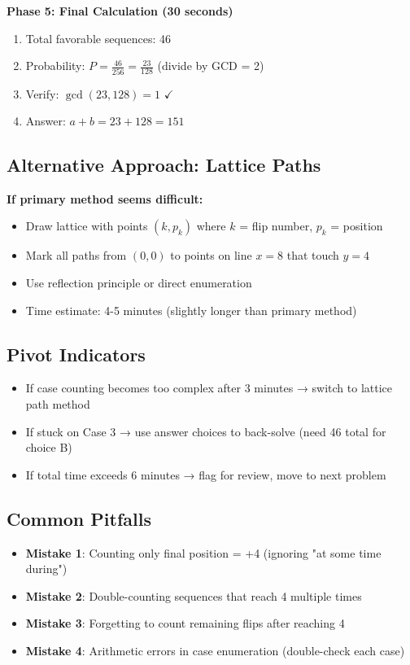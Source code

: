 \documentclass[]{article}
\begin{document}
\begin{solutionbox}
\textbf{Phase 5: Final Calculation (30 seconds)}
\begin{enumerate}
    \item Total favorable sequences: 46
    \item Probability: $P = \frac{46}{256} = \frac{23}{128}$ (divide by GCD = 2)
    \item Verify: $\gcd(23, 128) = 1$ $\checkmark$
    \item Answer: $a + b = 23 + 128 = 151$
\end{enumerate}

\subsection*{Alternative Approach: Lattice Paths}
\textbf{If primary method seems difficult:}
\begin{itemize}
    \item Draw lattice with points $(k, p_k)$ where $k$ = flip number, $p_k$ = position
    \item Mark all paths from $(0,0)$ to points on line $x=8$ that touch $y=4$
    \item Use reflection principle or direct enumeration
    \item Time estimate: 4-5 minutes (slightly longer than primary method)
\end{itemize}

\subsection*{Pivot Indicators}
\begin{itemize}
    \item If case counting becomes too complex after 3 minutes → switch to lattice path method
    \item If stuck on Case 3 → use answer choices to back-solve (need 46 total for choice B)
    \item If total time exceeds 6 minutes → flag for review, move to next problem
\end{itemize}

\subsection*{Common Pitfalls}
\begin{itemize}
    \item \textbf{Mistake 1}: Counting only final position = +4 (ignoring "at some time during")
    \item \textbf{Mistake 2}: Double-counting sequences that reach 4 multiple times
    \item \textbf{Mistake 3}: Forgetting to count remaining flips after reaching 4
    \item \textbf{Mistake 4}: Arithmetic errors in case enumeration (double-check each case)
\end{itemize}
\end{solutionbox}
\end{document}
